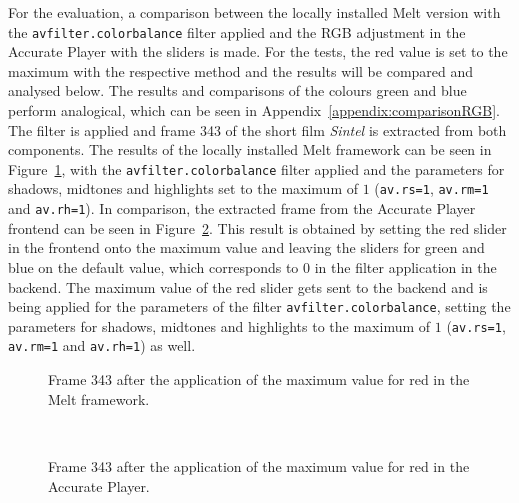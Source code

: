 \documentclass[../MasterThesis.tex]{subfiles}
\begin{document}
For the evaluation, a comparison between the locally installed Melt version with the \texttt{avfilter.colorbalance} filter applied and the RGB adjustment in the Accurate Player with the sliders is made.
For the tests, the red value is set to the maximum with the respective method and the results will be compared and analysed below. The results and comparisons of the colours green and blue perform analogical, which can be seen in Appendix~\ref{appendix:comparisonRGB}.
The filter is applied and frame 343 of the short film \textit{Sintel} is extracted from both components. The results of the locally installed Melt framework can be seen in Figure~\ref{figure:redMelt}, with the \texttt{avfilter.colorbalance} filter applied and the parameters for shadows, midtones and highlights set to the maximum of $1$ (\texttt{av.rs=1}, \texttt{av.rm=1} and \texttt{av.rh=1}).
In comparison, the extracted frame from the Accurate Player frontend can be seen in Figure~\ref{figure:redAP}. This result is obtained by setting the red slider in the frontend onto the maximum value and leaving the sliders for green and blue on the default value, which corresponds to $0$ in the filter application in the backend. The maximum value of the red slider gets sent to the backend and is being applied for the parameters of the filter \texttt{avfilter.colorbalance}, setting the parameters for shadows, midtones and highlights to the maximum of $1$ (\texttt{av.rs=1}, \texttt{av.rm=1} and \texttt{av.rh=1}) as well.



\begin{minipage}{0.48\textwidth}
	\begin{figure}[H]
		\begin{center}
			\caption[Frame 343 after the application of the red filter in the Melt framework.]{Frame 343 after the application of the maximum value for red in the Melt framework.}
			\label{figure:redMelt}
		\end{center}
	\end{figure}
\end{minipage}\begin{minipage}{0.04\textwidth}
	\ 
\end{minipage}\begin{minipage}{0.48\textwidth}
	\begin{figure}[H]
		\begin{center}
			\caption[Frame 343 after the application of the red filter in the Accurate Player.]{Frame 343 after the application of the maximum value for red in the Accurate Player.}
			\label{figure:redAP}
		\end{center}
	\end{figure}
\end{minipage}
\end{document}
